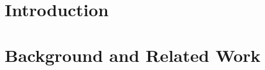 \documentclass[a4paper,12pt,twoside,openright]{report}
\begin{document}
\pagestyle{empty}
\singlespacing

\onehalfspacing

\singlespacing


\setcounter{page}{0}
\pagestyle{plain}
\tableofcontents
\onehalfspacing

\chapter{Introduction}
\setcounter{page}{1}
 

\chapter{Background and Related Work} 


%
 
%

%

\appendix
\singlespacing

 
 
\end{document}
